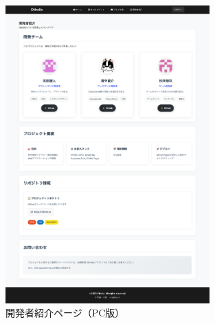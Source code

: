 \documentclass[10pt, a4paper]{jsarticle}
\begin{document}
\begin{figure}[H]
\centering
\includegraphics[width=0.7\textwidth]{img/developer-pc.png}
\caption{開発者紹介ページ（PC版）}
\label{fig:developer-pc}
\end{figure}
\end{document}
